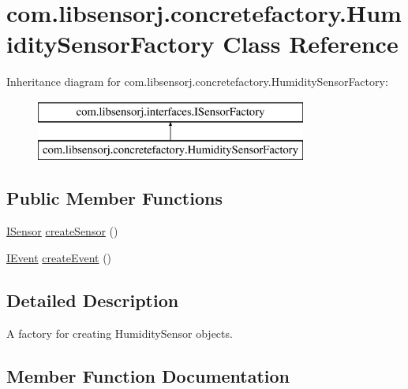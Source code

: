 \hypertarget{classcom_1_1libsensorj_1_1concretefactory_1_1HumiditySensorFactory}{}\section{com.\+libsensorj.\+concretefactory.\+Humidity\+Sensor\+Factory Class Reference}
\label{classcom_1_1libsensorj_1_1concretefactory_1_1HumiditySensorFactory}
Inheritance diagram for com.\+libsensorj.\+concretefactory.\+Humidity\+Sensor\+Factory\+:\begin{figure}[H]
\begin{center}
\leavevmode
\includegraphics[height=2.000000cm]{classcom_1_1libsensorj_1_1concretefactory_1_1HumiditySensorFactory}
\end{center}
\end{figure}
\subsection*{Public Member Functions}
\begin{DoxyCompactItemize}
\item 
\hyperlink{interfacecom_1_1libsensorj_1_1interfaces_1_1ISensor}{I\+Sensor} \hyperlink{classcom_1_1libsensorj_1_1concretefactory_1_1HumiditySensorFactory_aec6f80bd08e69d69ea6187067d11d28c}{create\+Sensor} ()
\item 
\hyperlink{classcom_1_1libsensorj_1_1interfaces_1_1IEvent}{I\+Event} \hyperlink{classcom_1_1libsensorj_1_1concretefactory_1_1HumiditySensorFactory_a43835bfa4c60faf39dfe64f67322b9e4}{create\+Event} ()
\end{DoxyCompactItemize}


\subsection{Detailed Description}
A factory for creating Humidity\+Sensor objects. 

\subsection{Member Function Documentation}
\hypertarget{classcom_1_1libsensorj_1_1concretefactory_1_1HumiditySensorFactory_a43835bfa4c60faf39dfe64f67322b9e4}{}
